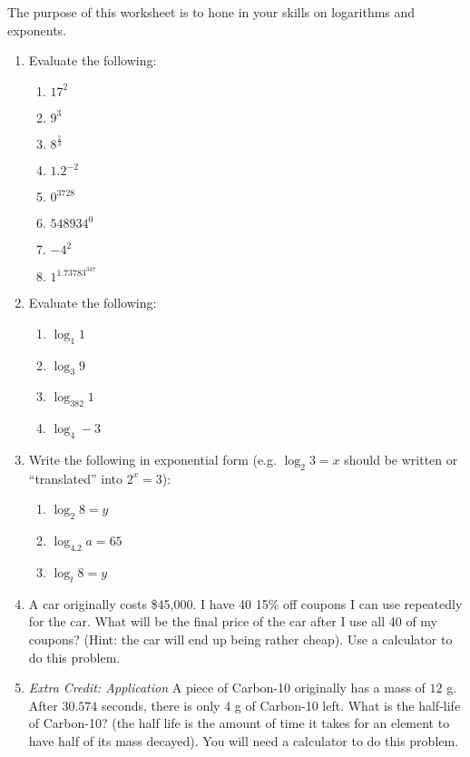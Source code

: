 The purpose of this worksheet is to hone in your skills on logarithms and exponents.

\begin{enumerate}
    \setlength\itemsep{2em}
    \item Evaluate the following:
        \begin{enumerate}
            \item $17^2$
            \item $9^{3}$
            \item $8^{\frac{2}{3}}$
            \item $1.2^{-2}$
            \item $0^{3728}$
            \item $548934^{0}$
            \item $-4^2$
            \item $1^{1.73783^{347}}$
        \end{enumerate}
    \item Evaluate the following:
        \begin{enumerate}
            \item $\log_1 1$
            \item $\log_3 9$
            \item $\log_{382} 1$
            \item $\log_4 -3$
        \end{enumerate}
    \item Write the following in exponential form (e.g. $\log_2 3 = x$ should be written or ``translated'' into $2^x=3$):
    \begin{enumerate}
        \item $\log_2 8 = y$
        \item $\log_{4.2} a = 65$
        \item $\log_t 8 = y$
    \end{enumerate}
    \item A car originally costs \$45,000. I have 40 15\% off coupons I can use repeatedly for the car. What will be the final price of the car after I use all 40 of my coupons? (Hint: the car will end up being rather cheap). Use a calculator to do this problem.
    \item \textit{Extra Credit: Application} A piece of Carbon-10 originally has a mass of $12$ g. After $30.574$ seconds, there is only $4$ g of Carbon-10 left. What is the half-life of Carbon-10? (the half life is the amount of time it takes for an element to have half of its mass decayed). You will need a calculator to do this problem.
\end{enumerate}